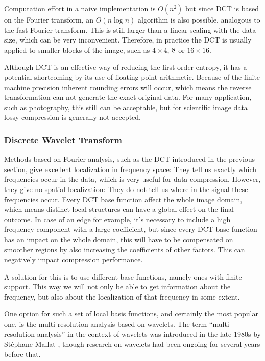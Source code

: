       Computation effort in a naive implementation is $O(n^2)$ but since DCT is based on the Fourier transform, an $O(n \log n)$ algorithm is also possible, analogous to the fast Fourier transform. This is still larger than a linear scaling with the data size, which can be very inconvenient. Therefore, in practice the DCT is usually applied to smaller blocks of the image, such as $4\times4$, $8\time8$ or $16\times16$. 

      Although DCT is an effective way of reducing the first-order entropy, it has a potential shortcoming by its use of floating point arithmetic. Because of the finite machine precision inherent rounding errors will occur, which means the reverse transformation can not generate the exact original data. For many application, such as photography, this still can be acceptable, but for scientific image data lossy compression is generally not accepted.


    \subsubsection{Discrete Wavelet Transform}
      Methods based on Fourier analysis, such as the DCT introduced in the previous section, give excellent localization in frequency space: They tell us exactly which frequencies occur in the data, which is very useful for data compression. However, they give no spatial localization: They do not tell us where in the signal these frequencies occur. Every DCT base function affect the whole image domain, which means distinct local structures can have a global effect on the final outcome. In case of an edge for example, it's necessary to include a high frequency component with a large coefficient, but since every DCT base function has an impact on the whole domain, this will have to be compensated on smoother regions by also increasing the coefficients of other factors. This can negatively impact compression performance.

      A solution for this is to use different base functions, namely ones with finite support. This way we will not only be able to get information about the frequency, but also about the localization of that frequency in some extent.

      One option for such a set of local basis functions, and certainly the most popular one, is the multi-resolution analysis based on wavelets. The term “multi-resolution analysis” in the context of wavelets was introduced in the late 1980s by Stéphane Mallat \cite{mallat_theory_1989}, though research on wavelets had been ongoing for several years before that.

